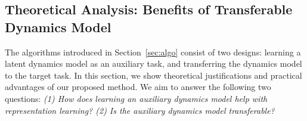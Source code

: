 
\subsection{Theoretical Analysis: Benefits of Transferable Dynamics Model}
\label{sec:theory}

The algorithms introduced in Section~\ref{sec:algo} consist of two designs: learning a latent dynamics model as an auxiliary task, and transferring the dynamics model to the target task.
In this section, we show theoretical justifications and practical advantages of our proposed method. 
We aim to answer the following two questions: \textit{(1) How does learning an auxiliary dynamics model help with representation learning? (2) Is the auxiliary dynamics model transferable?}

